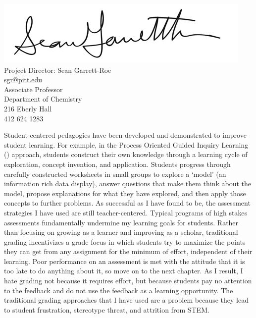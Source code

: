 \documentclass[10pt,letterpaper]{article}
\begin{document}
\newpage
\vspace*{\fill}
\begin{center}

\vspace{2\baselineskip}
\includegraphics{sgr_signature_2011_v2.jpg}\\
Project Director: Sean Garrett-Roe \\
\href{mailto:sgr@pitt.edu}{sgr@pitt.edu}\\
Associate Professor\\
Department of Chemistry\\
216 Eberly Hall\\
412 624 1283

\vspace{2\baselineskip}
 

\end{center}
\vspace{\fill}


\newpage
{} %

Student-centered pedagogies have been developed and demonstrated to improve student learning. 
For example, in the Process Oriented Guided Inquiry Learning (\pogil) approach, students construct their own knowledge
through a learning cycle of exploration, concept invention, and application.
Students progress through carefully constructed worksheets in small groups to explore a `model' (an information rich data display), answer questions that make them think about the model, propose explanations for what they have explored, and then apply those concepts to further problems.
% 
As successful as I have found \pogil to be, the assessment strategies I have used are still teacher-centered. Typical programs of high stakes assessments fundamentally undermine my learning goals for students. Rather than focusing on growing as a learner and improving as a scholar, traditional grading incentivizes a grade focus in which students try to maximize the points they can get from any assignment for the minimum of effort, independent of their learning. Poor performance on an assessment is met with the attitude that it is too late to do anything about it, so move on to the next chapter. As I result, I hate grading not because it requires effort, but because students pay no attention to the feedback and do not use the feedback as a learning opportunity. 
The traditional grading approaches that I have used are a problem because they lead to student frustration, stereotype threat, and attrition from STEM. 
\end{document}
